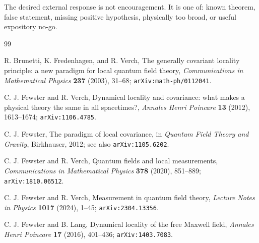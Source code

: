\documentclass[12pt]{article}
\theoremstyle{remark}
\begin{document}
The desired external response is not encouragement.  It is one of:
known theorem, false statement, missing positive hypothesis, physically too
broad, or useful expository no-go.

\begin{thebibliography}{99}

R. Brunetti, K. Fredenhagen, and R. Verch,
The generally covariant locality principle: a new paradigm for local quantum
field theory,
\emph{Communications in Mathematical Physics} \textbf{237} (2003), 31--68;
\texttt{arXiv:math-ph/0112041}.

C. J. Fewster and R. Verch,
Dynamical locality and covariance: what makes a physical theory the same in
all spacetimes?,
\emph{Annales Henri Poincare} \textbf{13} (2012), 1613--1674;
\texttt{arXiv:1106.4785}.

C. J. Fewster,
The paradigm of local covariance,
in \emph{Quantum Field Theory and Gravity}, Birkhauser, 2012;
see also \texttt{arXiv:1105.6202}.

C. J. Fewster and R. Verch,
Quantum fields and local measurements,
\emph{Communications in Mathematical Physics} \textbf{378} (2020), 851--889;
\texttt{arXiv:1810.06512}.

C. J. Fewster and R. Verch,
Measurement in quantum field theory,
\emph{Lecture Notes in Physics} \textbf{1017} (2024), 1--45;
\texttt{arXiv:2304.13356}.

C. J. Fewster and B. Lang,
Dynamical locality of the free Maxwell field,
\emph{Annales Henri Poincare} \textbf{17} (2016), 401--436;
\texttt{arXiv:1403.7083}.

\end{thebibliography}
\end{document}
